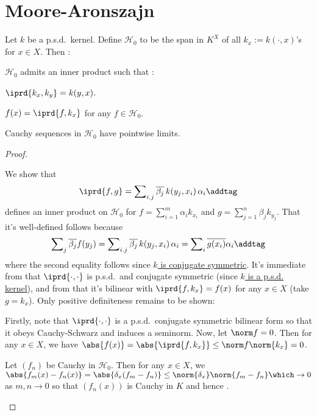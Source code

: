 	
	
\section{Moore-Aronszajn}


	\begin{lem}\label{LEM: space H_0}
		Let $k$ be a p.s.d.\ kernel. Define $\mathscr H_0$ to be the span in $K^X$ of all $k_x := k(\cdot, x)$'s for $x\in X$. Then \tfh:
		\begin{mylist}
			\item $\mathscr H_0$ admits an inner product such that \tfh:
			\begin{mylist}
				\item $\iprd{k_x, k_y} = k(y, x)$.
				
				\item $f(x) = \iprd{f, k_x}$ for any $f\in\mathscr H_0$.
			\end{mylist}
			
			\item Cauchy sequences in $\mathscr H_0$ have pointwise limits.
		\end{mylist}
	\end{lem}
	
	\begin{proof}
		\begin{mylist}
			\item 	We show that
			\[
			\iprd{f, g}
			= \sum\nolimits_{i. j} \overline{\beta_j}\, k(y_j, x_i)\,\alpha_i\addtag\label{EQN: inner prod on H_0}
			\]
			defines an inner product on $\mathscr H_0$ for $f = \sum_{i = 1}^m\alpha_i k_{x_i}$ and $g = \sum_{j = 1}^n \beta_j k_{y_j}$. That it's well-defined follows because
			\[
			\sum\nolimits_j \overline{\beta_j} f(y_j)
			= \sum\nolimits_{i. j} \overline{\beta_j}\, k(y_j, x_i)\,\alpha_i
			= \sum\nolimits_i \overline{g(x_i)} \alpha_i\addtag\label{EQN: inner prod on H_0 well-def}
			\]
			where the second equality follows since \uline{$k$ is conjugate symmetric}.
			It's immediate from  that $\iprd{\cdot, \cdot}$ is p.s.d.\ and conjugate symmetric (since \uline{$k$ is a p.s.d. kernel}), and from  that it's bilinear with $\iprd{f, k_x} = f(x)$ for any $x\in X$ (take $g = k_x$). Only positive definiteness remains to be shown:
			\begin{subproof}
				Firstly, note that $\iprd{\cdot, \cdot}$ is a p.s.d.\ conjugate symmetric bilinear form so that it obeys Cauchy-Schwarz and induces a seminorm. Now, let $\norm f = 0$. Then for any $x\in X$, we have $\abs{f(x)} = \abs{\iprd{f, k_x}} \le \norm f\norm{k_x} = 0$.
			\end{subproof}
			
			
			\item Let $(f_n)$ be Cauchy in $\mathscr H_0$. Then for any $x\in X$, we $\abs{ f_m(x) - f_n(x) } = \abs{\delta_x(f_m - f_n)}\le \norm{\delta_x}\norm{f_m - f_n}\which\to 0$ as $m, n\to 0$ so that $(f_n(x))$ is Cauchy in $K$ and hence \cgt.\qedhere
		\end{mylist}
	\end{proof}
	
